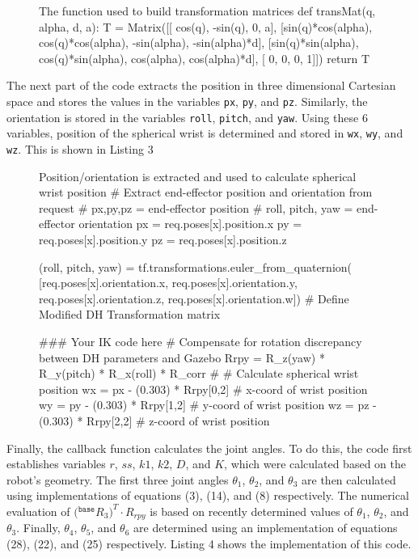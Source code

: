 \documentclass[a4paper]{article}
\begin{document}
\begin{figure}[h]\footnotesize
	\begin{sexylisting}{The function used to build transformation matrices}
def transMat(q, alpha, d, a):
   T = Matrix([[           cos(q),           -sin(q),           0,             a],
               [sin(q)*cos(alpha), cos(q)*cos(alpha), -sin(alpha), -sin(alpha)*d],
               [sin(q)*sin(alpha), cos(q)*sin(alpha),  cos(alpha),  cos(alpha)*d],
               [                 0,                0,           0,             1]])
   return T	
	\end{sexylisting}
\end{figure}

The next part of the code extracts the position in three dimensional Cartesian space and stores the values in the variables \verb|px|, \verb|py|, and \verb|pz|. Similarly, the orientation is stored in the variables \verb|roll|, \verb|pitch|, and \verb|yaw|. Using these 6 variables, position of the spherical wrist is determined and stored in \verb|wx|, \verb|wy|, and \verb|wz|. This is shown in Listing 3

\begin{figure}[h]\footnotesize
	\begin{sexylisting}{Position/orientation is extracted and used to calculate spherical wrist position}
# Extract end-effector position and orientation from request
# px,py,pz = end-effector position
# roll, pitch, yaw = end-effector orientation
px = req.poses[x].position.x
py = req.poses[x].position.y
pz = req.poses[x].position.z

(roll, pitch, yaw) = tf.transformations.euler_from_quaternion(
[req.poses[x].orientation.x, req.poses[x].orientation.y,
req.poses[x].orientation.z, req.poses[x].orientation.w])
# Define Modified DH Transformation matrix

### Your IK code here
# Compensate for rotation discrepancy between DH parameters and Gazebo
Rrpy = R_z(yaw) * R_y(pitch) * R_x(roll) * R_corr
#
# Calculate spherical wrist position
wx = px - (0.303) * Rrpy[0,2] # x-coord of wrist position
wy = py - (0.303) * Rrpy[1,2] # y-coord of wrist position
wz = pz - (0.303) * Rrpy[2,2] # z-coord of wrist position
	\end{sexylisting}
\end{figure}

Finally, the callback function calculates the joint angles. To do this, the code first establishes variables $r$, $ss$, $k1$, $k2$, $D$, and $K$, which were calculated based on the robot's geometry. The first three joint angles $\theta_1$, $\theta_2$, and $\theta_3$ are then calculated using implementations of equations (3), (14), and (8) respectively. The numerical evaluation of $\big({}^{\texttt{base}}R_3 \big)^T \cdot R_{rpy}$ is based on recently determined values of $\theta_1$, $\theta_2$, and $\theta_3$. Finally, $\theta_4$, $\theta_5$, and $\theta_6$ are determined using an implementation of equations (28), (22), and (25) respectively. Listing 4 shows the implementation of this code.
\end{document}
